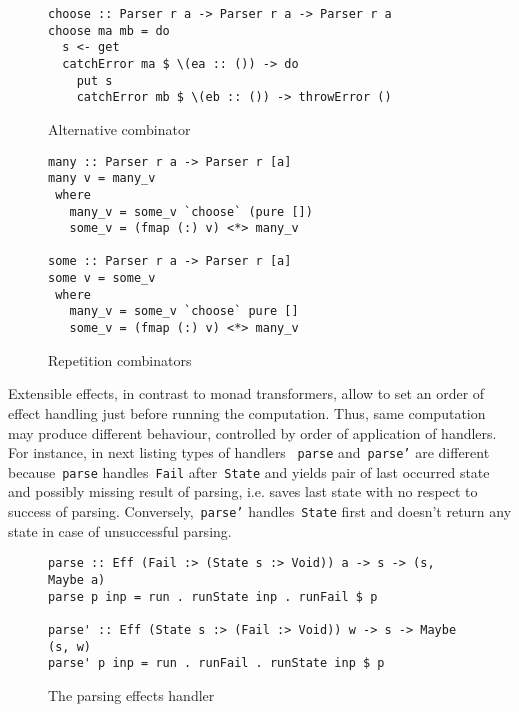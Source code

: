       \begin{figure}[h]
      \begin{lstlisting}
choose :: Parser r a -> Parser r a -> Parser r a
choose ma mb = do
  s <- get
  catchError ma $ \(ea :: ()) -> do
    put s
    catchError mb $ \(eb :: ()) -> throwError ()
      \end{lstlisting}
      \caption{Alternative combinator}
      \label{listing:ExtEffParsersChoose}
      \end{figure}

      \begin{figure}[h]
      \begin{lstlisting}
many :: Parser r a -> Parser r [a]
many v = many_v
 where
   many_v = some_v `choose` (pure [])
   some_v = (fmap (:) v) <*> many_v

some :: Parser r a -> Parser r [a]
some v = some_v
 where
   many_v = some_v `choose` pure []
   some_v = (fmap (:) v) <*> many_v
      \end{lstlisting}
      \caption{Repetition combinators}
      \label{listing:ExtEffParsersManySome}
      \end{figure}

      Extensible effects, in contrast to monad transformers, allow to set an order of
      effect handling just before running the computation. Thus, same computation may
      produce different behaviour, controlled by order of application of
      handlers. For instance, in next listing types of handlers
      ~\texttt{parse} and~\texttt{parse'} are different because~\texttt{parse}
      handles~\texttt{Fail} after~\texttt{State} and yields pair of last occurred
      state and possibly missing result of parsing, i.e. saves last state with no respect
      to success of parsing. Conversely,~\texttt{parse'} handles~\texttt{State}
      first and doesn't return any state in case of unsuccessful parsing.

      \begin{figure}[h]
      \begin{lstlisting}
parse :: Eff (Fail :> (State s :> Void)) a -> s -> (s, Maybe a)
parse p inp = run . runState inp . runFail $ p

parse' :: Eff (State s :> (Fail :> Void)) w -> s -> Maybe (s, w)
parse' p inp = run . runFail . runState inp $ p
      \end{lstlisting}
      \caption{The parsing effects handler}
      \label{listing:ExtEffParsersParse}
      \end{figure}

